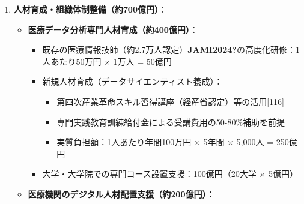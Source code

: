 \documentclass[
  a4paper,
  a4paper,
  11pt]{ltjsbook}
\providecommand{\tightlist}{%
  \setlength{\itemsep}{0pt}\setlength{\parskip}{0pt}}
\begin{document}
\begin{tcolorbox}
\begin{enumerate}
\begin{itemize}
    \begin{itemize}
    \tightlist
    \item
      重点病院（500施設）への先行導入：50億円
    \item
      ID管理・認証、EDR、CASB等の段階的実装
    \item
      中小医療機関向けクラウド型セキュリティサービス：50億円
    \end{itemize}
  \item
    \textbf{医療データ暗号化・匿名化技術の標準化（約100億円）}{[}115{]}：

    \begin{itemize}
    \tightlist
    \item
      次世代医療基盤法認定事業者の技術開発支援：30億円
    \item
      匿名加工・仮名加工処理技術の標準化：30億円
    \item
      全国展開のためのシステム実装・保守：40億円
    \end{itemize}
  \end{itemize}
\item
  \textbf{人材育成・組織体制整備（約700億円）}：

  \begin{itemize}
  \tightlist
  \item
    \textbf{医療データ分析専門人材育成（約400億円）}：

    \begin{itemize}
    \tightlist
    \item
      既存の医療情報技師（約2.7万人認定）\textbf{JAMI2024?}の高度化研修：1人あたり50万円
      × 1万人 = 50億円
    \item
      新規人材育成（データサイエンティスト養成）：

      \begin{itemize}
      \tightlist
      \item
        第四次産業革命スキル習得講座（経産省認定）等の活用{[}116{]}
      \item
        専門実践教育訓練給付金による受講費用の50-80\%補助を前提
      \item
        実質負担額：1人あたり年間100万円 × 5年間 × 5,000人 = 250億円
      \end{itemize}
    \item
      大学・大学院での専門コース設置支援：100億円（20大学 × 5億円）
    \end{itemize}
  \item
    \textbf{医療機関のデジタル人材配置支援（約200億円）}：


\end{itemize}
\end{enumerate}
\end{tcolorbox}
\end{document}
